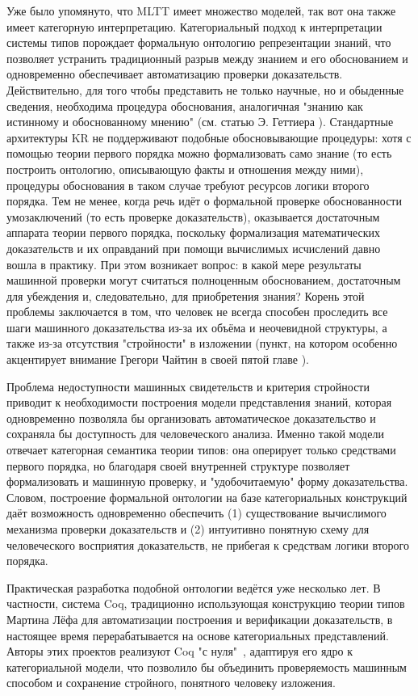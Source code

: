 \documentclass[14pt]{extarticle}
\begin{document}
	Уже было упомянуто, что MLTT имеет множество моделей, так вот она также имеет категорную интерпретацию.
	Категориальный подход к интерпретации системы типов порождает формальную онтологию репрезентации знаний, что позволяет устранить традиционный разрыв между знанием и его обоснованием и одновременно обеспечивает автоматизацию проверки доказательств. Действительно, для того чтобы представить не только научные, но и обыденные сведения, необходима процедура обоснования, аналогичная "знанию как истинному и обоснованному мнению" (см. статью Э. Геттиера \cite{gettier1963}). Стандартные архитектуры KR не поддерживают подобные обосновывающие процедуры: хотя с помощью теории первого порядка можно формализовать само знание (то есть построить онтологию, описывающую факты и отношения между ними), процедуры обоснования в таком случае требуют ресурсов логики второго порядка. Тем не менее, когда речь идёт о формальной проверке обоснованности умозаключений (то есть проверке доказательств), оказывается достаточным аппарата теории первого порядка, поскольку формализация математических доказательств и их оправданий при помощи вычислимых исчислений давно вошла в практику. При этом возникает вопрос: в какой мере результаты машинной проверки могут считаться полноценным обоснованием, достаточным для убеждения и, следовательно, для приобретения знания? Корень этой проблемы заключается в том, что человек не всегда способен проследить все шаги машинного доказательства из-за их объёма и неочевидной структуры, а также из-за отсутствия "стройности" в изложении (пункт, на котором особенно акцентирует внимание Грегори Чайтин в своей пятой главе \cite{Chaitin1999TheU}).
	
	Проблема недоступности машинных свидетельств и критерия стройности приводит к необходимости построения модели представления знаний, которая одновременно позволяла бы организовать автоматическое доказательство и сохраняла бы доступность для человеческого анализа. Именно такой модели отвечает категорная семантика теории типов: она оперирует только средствами первого порядка, но благодаря своей внутренней структуре позволяет формализовать и машинную проверку, и "удобочитаемую" форму доказательства. Словом, построение формальной онтологии на базе категориальных конструкций даёт возможность одновременно обеспечить (1) существование вычислимого механизма проверки доказательств и (2) интуитивно понятную схему для человеческого восприятия доказательств, не прибегая к средствам логики второго порядка.
	
	Практическая разработка подобной онтологии ведётся уже несколько лет. В частности, система Coq, традиционно использующая конструкцию теории типов Мартина Лёфа для автоматизации построения и верификации доказательств, в настоящее время перерабатывается на основе категориальных представлений. Авторы этих проектов реализуют Coq "с нуля"\  , адаптируя его ядро к категориальной модели, что позволило бы объединить проверяемость машинным способом и сохранение стройного, понятного человеку изложения. 
		
\end{document}
